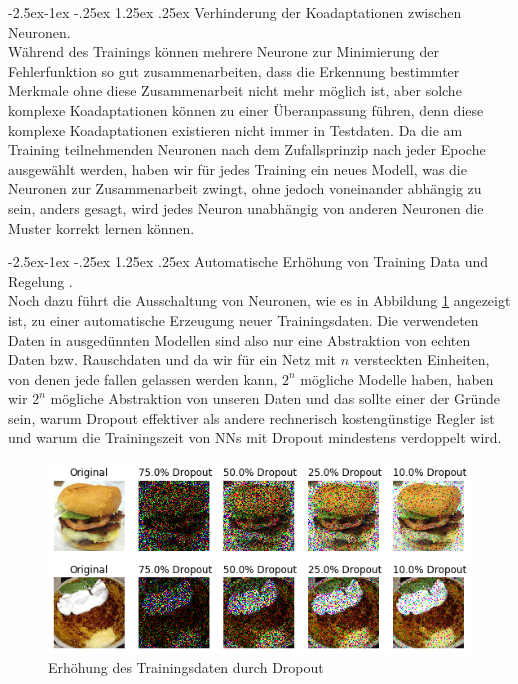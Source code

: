 \documentclass[12pt,a4paper]{scrartcl}
\makeatletter
\numberwithin{equation}{section}
\renewcommand\paragraph{\@startsection{paragraph}{4}{\z@}%
	{-2.5ex\@plus -1ex \@minus -.25ex}%
	{1.25ex \@plus .25ex}%
	{\normalfont\normalsize\bfseries}}
\makeatother
\begin{document}
\paragraph{Verhinderung der Koadaptationen zwischen Neuronen}.\\
Während des Trainings können mehrere Neurone zur Minimierung der Fehlerfunktion so gut zusammenarbeiten, dass die Erkennung bestimmter Merkmale ohne diese Zusammenarbeit nicht mehr möglich ist, aber solche komplexe Koadaptationen  können zu einer Überanpassung führen, denn diese komplexe Koadaptationen existieren nicht immer in Testdaten. Da die am Training teilnehmenden Neuronen nach dem Zufallsprinzip nach jeder Epoche ausgewählt werden, haben wir für jedes Training ein neues Modell, was die Neuronen zur Zusammenarbeit zwingt, ohne jedoch voneinander abhängig zu sein, anders gesagt, wird jedes Neuron unabhängig von anderen Neuronen die Muster korrekt lernen können.  

\paragraph{Automatische Erhöhung von Training Data und Regelung }.\\
Noch dazu führt die Ausschaltung von Neuronen, wie es in Abbildung \ref{fig:DropoutDataAugmentation} angezeigt ist, zu einer automatische Erzeugung neuer Trainingsdaten. Die verwendeten Daten in ausgedünnten Modellen sind also nur eine Abstraktion von echten Daten bzw. Rauschdaten und da wir für ein Netz mit $ n $ versteckten Einheiten, von denen jede fallen gelassen werden kann, $ 2^n $ mögliche Modelle haben, haben wir $ 2^n $ mögliche Abstraktion von unseren Daten und das sollte einer der Gründe sein, warum Dropout effektiver als andere rechnerisch kostengünstige Regler ist \cite{3} und warum die Trainingszeit von \acsp{NN} mit Dropout mindestens verdoppelt wird. 

\begin{figure}[h]
	\centering
	\includegraphics{model}
	\caption{Erhöhung des Trainingsdaten durch Dropout}
	\label{fig:DropoutDataAugmentation}
\end{figure}
\end{document}
